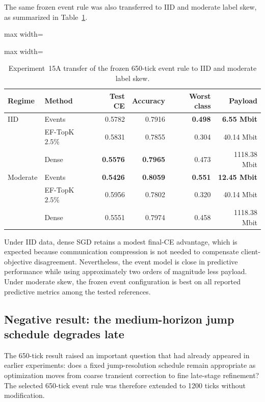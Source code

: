 The same frozen event rule was also transferred to IID and moderate label skew, as summarized in Table~\ref{tab:exp15a-heterogeneity-transfer}.
\begin{table}[ht]
\centering
\small
\caption{Experiment~15A transfer of the frozen 650-tick event rule to IID and moderate label skew.}
\label{tab:exp15a-heterogeneity-transfer}
\begin{adjustbox}{max width=\textwidth}
\begin{adjustbox}{max width=\textwidth}
\begin{tabular}{llrrrr}
\toprule
Regime & Method & Test CE & Accuracy & Worst class & Payload\\
\midrule
IID & Events & 0.5782 & 0.7916 & \textbf{0.498} & \textbf{6.55 Mbit}\\
 & EF-TopK $2.5\%$ & 0.5831 & 0.7855 & 0.304 & 40.14 Mbit\\
 & Dense & \textbf{0.5576} & \textbf{0.7965} & 0.473 & 1118.38 Mbit\\
\addlinespace
Moderate & Events & \textbf{0.5426} & \textbf{0.8059} & \textbf{0.551} & \textbf{12.45 Mbit}\\
 & EF-TopK $2.5\%$ & 0.5956 & 0.7802 & 0.320 & 40.14 Mbit\\
 & Dense & 0.5551 & 0.7974 & 0.458 & 1118.38 Mbit\\
\bottomrule
\end{tabular}
\end{adjustbox}
\end{adjustbox}
\end{table}
Under IID data, dense SGD retains a modest final-CE advantage, which is expected because communication compression is not needed to compensate client-objective disagreement. Nevertheless, the event model is close in predictive performance while using approximately two orders of magnitude less payload. Under moderate skew, the frozen event configuration is best on all reported predictive metrics among the tested references.

\subsection{Negative result: the medium-horizon jump schedule degrades late}

The 650-tick result raised an important question that had already appeared in earlier experiments: does a fixed jump-resolution schedule remain appropriate as optimization moves from coarse transient correction to fine late-stage refinement? The selected 650-tick event rule was therefore extended to 1200 ticks without modification.

